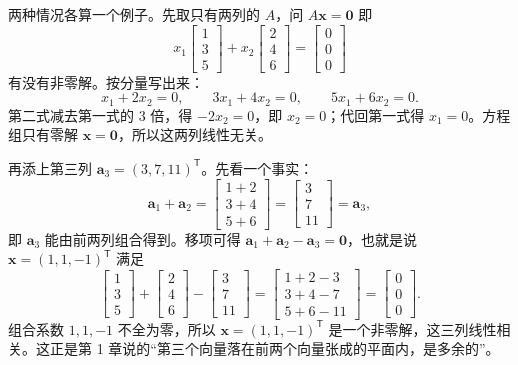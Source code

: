 \documentclass[UTF8,a4paper,12pt]{ctexart}
\numberwithin{equation}{section}
\newcommand{\trans}{^{\mathsf T}}
\begin{document}
	两种情况各算一个例子。先取只有两列的 $A$，问 $A\bm{x}=\bm{0}$ 即
	\begin{equation}\label{eq:3.26}
	x_1
	\begin{bmatrix}
		1\\3\\5
	\end{bmatrix}
	+x_2
	\begin{bmatrix}
		2\\4\\6
	\end{bmatrix}
	=
	\begin{bmatrix}
		0\\0\\0
	\end{bmatrix}
	\end{equation}
	有没有非零解。按分量写出来：
	\begin{equation}\label{eq:3.27}
	x_1+2x_2=0,
	\qquad
	3x_1+4x_2=0,
	\qquad
	5x_1+6x_2=0.
	\end{equation}
	第二式减去第一式的 $3$ 倍，得 $-2x_2=0$，即 $x_2=0$；代回第一式得 $x_1=0$。方程组只有零解 $\bm{x}=\bm{0}$，所以这两列线性无关。
	
	再添上第三列 $\bm{a}_3=(3,7,11)\trans$。先看一个事实：
	\begin{equation}\label{eq:3.28}
	\bm{a}_1+\bm{a}_2
	=
	\begin{bmatrix}
		1+2\\3+4\\5+6
	\end{bmatrix}
	=
	\begin{bmatrix}
		3\\7\\11
	\end{bmatrix}
	=\bm{a}_3,
	\end{equation}
	即 $\bm{a}_3$ 能由前两列组合得到。移项可得 $\bm{a}_1+\bm{a}_2-\bm{a}_3=\bm{0}$，也就是说 $\bm{x}=(1,1,-1)\trans$ 满足
	\begin{equation}\label{eq:3.29}
	\begin{bmatrix}
		1\\3\\5
	\end{bmatrix}
	+
	\begin{bmatrix}
		2\\4\\6
	\end{bmatrix}
	-
	\begin{bmatrix}
		3\\7\\11
	\end{bmatrix}
	=
	\begin{bmatrix}
		1+2-3\\3+4-7\\5+6-11
	\end{bmatrix}
	=
	\begin{bmatrix}
		0\\0\\0
	\end{bmatrix}.
	\end{equation}
	组合系数 $1,1,-1$ 不全为零，所以 $\bm{x}=(1,1,-1)\trans$ 是一个非零解，这三列线性相关。这正是第 1 章说的“第三个向量落在前两个向量张成的平面内，是多余的”。
	
\end{document}

